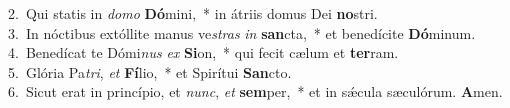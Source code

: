 {2.~}Qui statis in \textit{do}\textit{mo} \textbf{Dó}mini,~* in átriis domus Dei \textbf{no}stri.\\
{3.~}In nóctibus extóllite manus ve\textit{stras} \textit{in} \textbf{san}cta,~* et benedícite \textbf{Dó}minum.\\
{4.~}Benedícat te Dómi\textit{nus} \textit{ex} \textbf{Si}on,~* qui fecit cælum et \textbf{ter}ram.\\
{5.~}Glória Pa\textit{tri}, \textit{et} \textbf{Fí}lio,~* et Spirítui \textbf{San}cto.\\
{6.~}Sicut erat in princípio, et \textit{nunc}, \textit{et} \textbf{sem}per,~* et in sǽcula sæculórum. \textbf{A}men.\\
